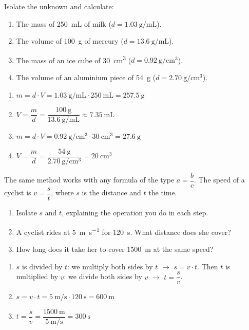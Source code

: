 \begin{exercise}
    Isolate the unknown and calculate:
    \begin{enumerate}[label=\letraminuscula]
        \item The mass of \qty{250}{\mL} of milk (\(d = \qty{1.03}{\g\per\mL}\)).
        \item The volume of \qty{100}{\g} of mercury (\(d = \qty{13.6}{\g\per\mL}\)).
        \item The mass of an ice cube of \qty{30}{\cubic\cm} (\(d = \qty{0.92}{\g\per\cubic\cm}\)).
        \item The volume of an aluminium piece of \qty{54}{\g} (\(d = \qty{2.70}{\g\per\cubic\cm}\)).
    \end{enumerate}
    \begin{solu}
        \begin{enumerate}[label=\alph*)]
            \item \(m = d \cdot V = \qty{1.03}{\g\per\mL} \cdot \qty{250}{\mL} = \qty{257.5}{\g}\)
            \item \(V = \dfrac{m}{d} = \dfrac{\qty{100}{\g}}{\qty{13.6}{\g\per\mL}} \approx \qty{7.35}{\mL}\)
            \item \(m = d \cdot V = \qty{0.92}{\g\per\cubic\cm} \cdot \qty{30}{\cubic\cm} = \qty{27.6}{\g}\)
            \item \(V = \dfrac{m}{d} = \dfrac{\qty{54}{\g}}{\qty{2.70}{\g\per\cubic\cm}} = \qty{20}{\cubic\cm}\)
        \end{enumerate}
    \end{solu}
\end{exercise}

\begin{exercise}
    The same method works with any formula of the type \(a = \dfrac{b}{c}\). The speed of a cyclist is \(v = \dfrac{s}{t}\), where \(s\) is the distance and \(t\) the time.
    \begin{enumerate}[label=\letraminuscula]
        \item Isolate \(s\) and \(t\), explaining the operation you do in each step.
        \item A cyclist rides at \qty{5}{\m\per\s} for \qty{120}{\s}. What distance does she cover?
        \item How long does it take her to cover \qty{1500}{\m} at the same speed?
    \end{enumerate}
    \begin{solu}
        \begin{enumerate}[label=\alph*)]
            \item \(s\) is divided by \(t\): we multiply both sides by \(t\) \(\to\) \(s = v \cdot t\). Then \(t\) is multiplied by \(v\): we divide both sides by \(v\) \(\to\) \(t = \dfrac{s}{v}\).
            \item \(s = v \cdot t = \qty{5}{\m\per\s} \cdot \qty{120}{\s} = \qty{600}{\m}\)
            \item \(t = \dfrac{s}{v} = \dfrac{\qty{1500}{\m}}{\qty{5}{\m\per\s}} = \qty{300}{\s}\)
        \end{enumerate}
    \end{solu}
\end{exercise}

